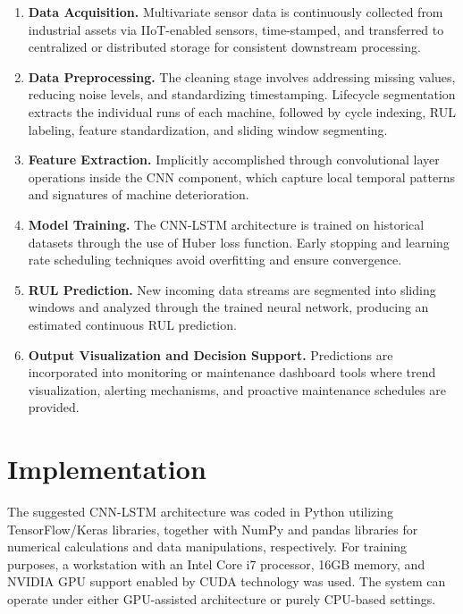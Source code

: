 \documentclass[conference]{IEEEtran}
\begin{document}
\begin{enumerate}
  \item \textbf{Data Acquisition.} Multivariate sensor data is continuously collected from industrial assets via IIoT-enabled sensors, time-stamped, and transferred to centralized or distributed storage for consistent downstream processing.

  \item \textbf{Data Preprocessing.} The cleaning stage involves addressing missing values, reducing noise levels, and standardizing timestamping. Lifecycle segmentation extracts the individual runs of each machine, followed by cycle indexing, RUL labeling, feature standardization, and sliding window segmenting.

  \item \textbf{Feature Extraction.} Implicitly accomplished through convolutional layer operations inside the CNN component, which capture local temporal patterns and signatures of machine deterioration.

  \item \textbf{Model Training.} The CNN-LSTM architecture is trained on historical datasets through the use of Huber loss function. Early stopping and learning rate scheduling techniques avoid overfitting and ensure convergence.

  \item \textbf{RUL Prediction.} New incoming data streams are segmented into sliding windows and analyzed through the trained neural network, producing an estimated continuous RUL prediction.

  \item \textbf{Output Visualization and Decision Support.} Predictions are incorporated into monitoring or maintenance dashboard tools where trend visualization, alerting mechanisms, and proactive maintenance schedules are provided.
\end{enumerate}

\section{Implementation}

The suggested CNN-LSTM architecture was coded in Python utilizing TensorFlow/Keras libraries, together with NumPy and pandas libraries for numerical calculations and data manipulations, respectively. For training purposes, a workstation with an Intel Core i7 processor, 16GB memory, and NVIDIA GPU support enabled by CUDA technology was used. The system can operate under either GPU-assisted architecture or purely CPU-based settings.
\end{document}
